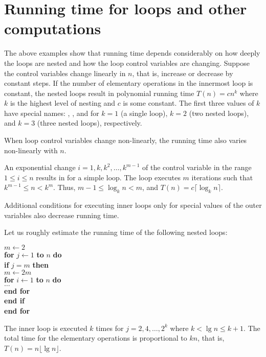\section{Running time for loops and other computations}
\label{rt-loops}

The above examples show that running time depends considerably on how
deeply the loops are nested and how the loop control variables are
changing. Suppose the control variables change linearly in $n$, that
is, increase or decrease by constant steps. If the number of elementary
operations in the innermost loop is constant, the nested loops result
in polynomial running time $T(n) = c  n^{k}$ where $k$ is
the highest level of nesting and $c$ is some constant. The first three
values of $k$ have special names: , 
,
and  for $k=1$ (a single loop), $k=2$ (two nested
loops), and $k=3$ (three nested loops), respectively.

When loop control variables change non-linearly,
the running time also varies non-linearly with $n$.

\begin{Example} 
An exponential change \(i=1,k,k^2 ,\ldots, k^{m-1}\) of
the control variable  in the
range \(1 \le i \le n\) results in 
for a simple loop. The loop executes $m$ 
iterations such that $k^{m-1} \le  n  < k^{m}$. Thus, $m-1 \le \log_{k} n
< m$, and $T(n) = c  \lceil \log_{k} n \rceil$.
\end{Example}
 
Additional conditions for executing inner loops only for special values of 
the outer variables also decrease running time. 

\begin{Example} 
\label{exm:nest2}
Let us roughly estimate the running time of the following nested loops:
 
\hspace*{.3in}\begin{minipage}{5in}
\Algorbody
{
\(m \leftarrow 2\) \\
\textbf{for} \(j \leftarrow 1\) \textbf{to} \(n\) \textbf{do}\\
\>\textbf{if} \(j = m \) \textbf{then} \\
\>\> \(m \leftarrow 2m\) \\
\>\>\textbf{for} \(i \leftarrow  1\) \textbf{to} \(n\) \textbf{do}\\
\>\>\>$\ldots$  \\
\>\>\textbf{end for} \\
\>\textbf{end if}\\
\textbf{end for}\\
}
\end{minipage}

The inner loop is executed $k$ times for $j=2, 4, \ldots, 2^{k}$
where $k < \lg n \le k+1$. The total time for the elementary operations is 
proportional to $kn$, that is, $T(n)=  n  \lfloor \lg n \rfloor$.    
\end{Example}



